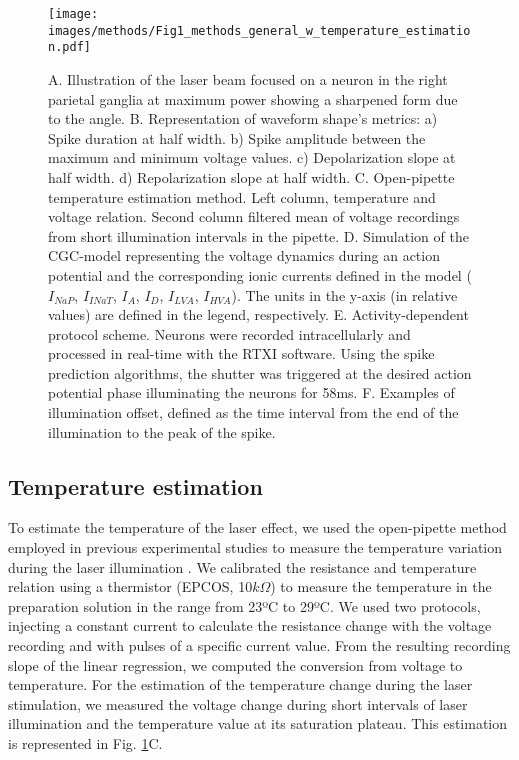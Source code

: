 \begin{figure}[htb!]
    \centering
    \texttt{[image: images/methods/Fig1\_methods\_general\_w\_temperature\_estimation.pdf]}
    \caption{A. Illustration of the laser beam focused on a neuron in the right parietal ganglia at maximum power showing a sharpened form due to the angle. B. Representation of waveform shape's metrics: a) Spike duration at half width. b) Spike amplitude between the maximum and minimum voltage values. c) Depolarization slope at half width. d) Repolarization slope at half width. C. Open-pipette temperature estimation method. Left column, temperature and voltage relation. Second column filtered mean of voltage recordings from short illumination intervals in the pipette. D. Simulation of the CGC-model representing the voltage dynamics during an action potential and the corresponding ionic currents defined in the model ($I_{NaP}$, $I_{INaT}$, $I_A$, $I_D$, $I_{LVA}$, $I_{HVA}$). The units in the y-axis (in relative values) are defined in the legend, respectively. E. Activity-dependent protocol scheme. Neurons were recorded intracellularly and processed in real-time with the RTXI software. Using the spike prediction algorithms, the shutter was triggered at the desired action potential phase illuminating the neurons for 58ms. F. Examples of illumination offset, defined as the time interval from the end of the illumination to the peak of the spike.}
    \label{fig:methods_general}
\end{figure}

\subsection{Temperature estimation}
\label{sec:temperature-estimation}
To estimate the temperature of the laser effect, we used the open-pipette method employed in previous experimental studies to measure the temperature variation during the laser illumination \cite{Li2013, Rabbitt2016,Brown2020, Brown2021}. We calibrated the resistance and temperature relation using a thermistor (EPCOS, 10$k\Omega$) to measure the temperature in the preparation solution in the range from 23ºC to 29ºC. We used two protocols, injecting a constant current to calculate the resistance change with the voltage recording and with pulses of a specific current value. From the resulting recording slope of the linear regression, we computed the conversion from voltage to temperature. For the estimation of the temperature change during the laser stimulation, we measured the voltage change during short intervals of laser illumination and the temperature value at its saturation plateau. This estimation is represented in Fig. \ref{fig:methods_general}C.

